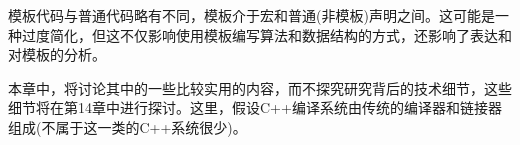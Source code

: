 模板代码与普通代码略有不同，模板介于宏和普通(非模板)声明之间。这可能是一种过度简化，但这不仅影响使用模板编写算法和数据结构的方式，还影响了表达和对模板的分析。

本章中，将讨论其中的一些比较实用的内容，而不探究研究背后的技术细节，这些细节将在第14章中进行探讨。这里，假设C++编译系统由传统的编译器和链接器组成(不属于这一类的C++系统很少)。